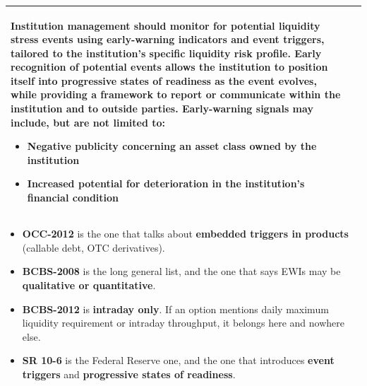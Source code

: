 \begin{center}
\begin{longtable}{@{}p{2.5cm} p{11.4cm}@{}}
Institution management should monitor for potential liquidity stress events using early-warning indicators and \textbf{event triggers}, tailored to the institution's specific liquidity risk profile. Early recognition of potential events allows the institution to position itself into \textbf{progressive states of readiness} as the event evolves, while providing a framework to report or communicate within the institution and to outside parties. Early-warning signals may include, but are not limited to:
\begin{itemize}
\item \textbf{Negative publicity concerning an asset class owned by the institution}
\item \textbf{Increased potential for deterioration in the institution's financial condition}
\end{itemize} \\
\bottomrule
\end{longtable}
\end{center}

\begin{lrtrapbox}
\begin{itemize}
\item \textbf{OCC-2012} is the one that talks about \textbf{embedded triggers in products} (callable debt, OTC derivatives).
\item \textbf{BCBS-2008} is the long general list, and the one that says EWIs may be \textbf{qualitative or quantitative}.
\item \textbf{BCBS-2012} is \textbf{intraday only}. If an option mentions daily maximum liquidity requirement or intraday throughput, it belongs here and nowhere else.
\item \textbf{SR 10-6} is the Federal Reserve one, and the one that introduces \textbf{event triggers} and \textbf{progressive states of readiness}.
\end{itemize}
\end{lrtrapbox}


